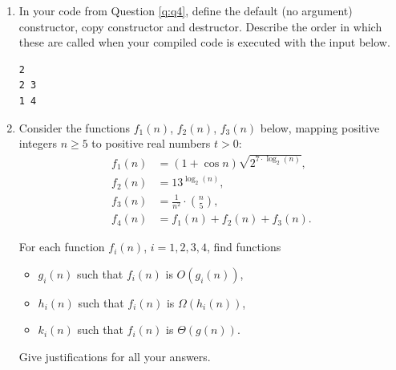 \documentclass[a4paper,12pt]{article}
\begin{document}
\begin{enumerate}
{\bf Sample input}

\begin{Verbatim}[frame=single]
5
4 17
4 17
5 1000
7 12
7 9
\end{Verbatim}

{\bf Sample output}

\begin{Verbatim}[frame=single]
4 17
5 1000
7 12
\end{Verbatim}

\clearpage

\item 
In your code from Question \ref{q:q4}, define the default (no argument) constructor, copy constructor 
and destructor. Describe the order in which these are called when your compiled code is executed with the input below.

\begin{Verbatim}[frame=single]
2
2 3
1 4
\end{Verbatim}

\vspace{1cm}

\item

Consider the functions $f_1(n)$, $f_2(n)$, $f_3(n)$ below, mapping positive integers $n \geq 5$
to positive real numbers $t>0$: 
% 
\begin{align*}
f_1(n) & = (1 + \cos n) \sqrt{2^{7 \cdot \log_2 (n)}},\\
f_2(n) & = 13^{\log_2 (n)},\\
f_3(n) & = \frac{1}{n^2} \cdot {n \choose 5},\\
f_4(n) & = f_1(n) + f_2(n) + f_3(n).
\end{align*}

For each function $f_i(n)$, $i=1,2,3,4$, find functions 
\begin{itemize}
\item $g_i(n)$ such that $f_i(n)$ is $O(g_i(n))$,
\item $h_i(n)$ such that $f_i(n)$ is $\Omega(h_i(n))$, 
\item $k_i(n)$ such that $f_i(n)$ is $\Theta(g(n))$. 
\end{itemize}
Give justifications for all your answers.


\end{enumerate}
\end{document}
